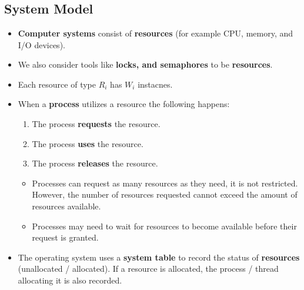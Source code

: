 \documentclass{article}
\begin{document}
    \section*{}

    \subsection*{System Model}
    \begin{itemize}
        \item \textbf{Computer systems} consist of \textbf{resources} (for example CPU, memory, and I/O devices).
        \item We also consider tools like \textbf{locks, and semaphores} to be \textbf{resources}.
        \item Each resource of type $R_i$ has $W_i$ instacnes.
        \item When a \textbf{process} utilizes a resource the following happens:
        \begin{enumerate}
            \item The process \textbf{requests} the resource.
            \item The process \textbf{uses} the resource.
            \item The process \textbf{releases} the resource.
        \end{enumerate}
        \begin{itemize}
            \item Processes can request as many resources as they need, it is not restricted. However, the number of resources requested cannot exceed the amount of resources available.
            \item Processes may need to wait for resources to become available before their request is granted.
        \end{itemize}
        \item The operating system uses a \textbf{system table} to record the status of \textbf{resources} (unallocated / allocated). If a resource is allocated, the process / thread allocating it is also recorded.
    \end{itemize}
\end{document}
